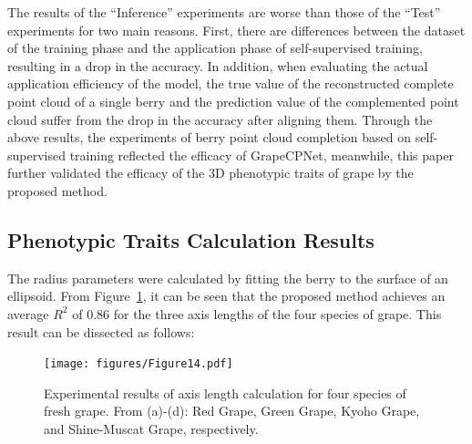 \documentclass[12pt]{article}
\begin{document}
The results of the ``Inference'' experiments are worse than those of the ``Test'' experiments for two main reasons.
First, there are differences between the dataset of the training phase and the application phase of self-supervised training, resulting in a drop in the accuracy. 
In addition, when evaluating the actual application efficiency of the model, the true value of the reconstructed complete point cloud of a single berry and the prediction value of the complemented point cloud suffer from the drop in the accuracy after aligning them. 
Through the above results, the experiments of berry point cloud completion based on self-supervised training reflected the efficacy of GrapeCPNet, meanwhile, this paper further validated the efficacy of the 3D phenotypic traits of grape by the proposed method.

\subsection{Phenotypic Traits Calculation Results}

The radius parameters were calculated by fitting the berry to the surface of an ellipsoid.
From Figure~\ref{fig:raw17}, it can be seen that the proposed method achieves an average $R^2$ of 0.86  for the three axis lengths of the four species of grape. 
This result can be dissected as follows:

\begin{figure}[hbt!]
    \centering
    \texttt{[image: figures/Figure14.pdf]}
    \caption{Experimental results of axis length calculation for four species of fresh grape. From (a)-(d): Red Grape, Green Grape, Kyoho Grape, and Shine-Muscat Grape, respectively. }
    \label{fig:raw17}
\end{figure}
\end{document}
